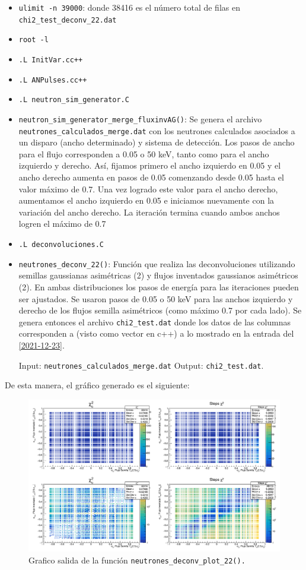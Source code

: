 \documentclass[11pt,letterpaper]{article}
\begin{document}
\begin{itemize}
\item \verb|ulimit -n 39000|: donde 38416 es el número total de filas en \verb|chi2_test_deconv_22.dat|
\item \verb|root -l|
\item \verb|.L InitVar.cc++|
\item \verb|.L ANPulses.cc++|
\item \verb|.L neutron_sim_generator.C|
\item \verb|neutron_sim_generator_merge_fluxinvAG()|: Se genera el archivo \verb|neutrones_calculados_merge.dat| con los neutrones calculados asociados a un disparo (ancho determinado) y sistema de detección. Los pasos de ancho para el flujo corresponden a 0.05 o 50 keV, tanto como para el ancho izquierdo y derecho. Así, fijamos primero el ancho izquierdo en 0.05 y el ancho derecho aumenta en pasos de 0.05 comenzando desde 0.05 hasta el valor máximo de 0.7. Una vez logrado este valor para el ancho derecho, aumentamos el ancho izquierdo en 0.05 e iniciamos nuevamente con la variación del ancho derecho. La iteración termina cuando ambos anchos logren el máximo de 0.7 
\item \verb|.L deconvoluciones.C|
\item \verb|neutrones_deconv_22()|: 
Función que realiza las deconvoluciones utilizando semillas gaussianas asimétricas (2) y flujos inventados gaussianos asimétricos (2). En ambas distribuciones los pasos de energía para las iteraciones pueden ser ajustados. Se usaron pasos de 0.05 o 50 keV para las anchos izquierdo y derecho de los flujos semilla asimétricos (como máximo 0.7 por cada lado). Se genera entonces el archivo \verb|chi2_test.dat| donde los datos de las columnas corresponden a (visto como vector en c++) a lo mostrado en la entrada del \ref{2021-12-23}.

Input: \verb|neutrones_calculados_merge.dat| Output:  \verb|chi2_test.dat|.
\end{itemize}

De esta manera, el gráfico generado es el siguiente:

 \begin{figure}[H]
    \includegraphics[width=1.\textwidth]{img/plot_deconv_22_fail.png}
    \centering
     \cprotect\caption{Grafico salida de la función \verb|neutrones_deconv_plot_22().|} 
\label{neutrones_deconv_plot_22_fail}
\end{figure}
\end{document}
